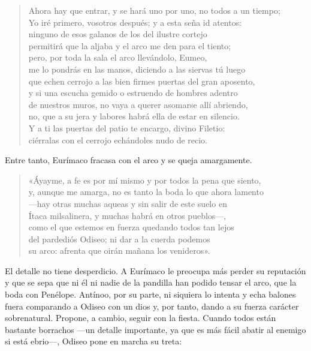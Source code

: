 \begin{verse}
Ahora hay que entrar, y se hará uno por uno, no todos a un tiempo;\\
Yo iré primero, vosotros después; y a esta seña id atentos:\\
ninguno de esos galanos de los del ilustre cortejo\\
permitirá que la aljaba y el arco me den para el tiento;\\
pero, por toda la sala el arco llevándolo, Eumeo,\\
me lo pondrás en las manos, diciendo a las siervas tú luego\\
que echen cerrojo a las bien firmes puertas del gran aposento,\\
y si una escucha gemido o estruendo de hombres adentro\\
de nuestros muros, no vaya a querer asomarse allí abriendo,\\
no, que a su jera y labores habrá ella de estar en silencio.\\
Y a ti las puertas del patio te encargo, divino Filetio:\\
ciérralas con el cerrojo echándoles nudo de recio.
\end{verse}

Entre tanto, Eurímaco fracasa con el arco y se queja amargamente.

\begin{verse}
«Áyayme, a fe es por mí mismo y por todos la pena que siento,\\
y, aunque me amarga, no es tanto la boda lo que ahora lamento\\
---hay otras muchas aqueas y sin salir de este suelo en\\
Ítaca milsalinera, y muchas habrá en otros pueblos---,\\
como el que estemos en fuerza quedando todos tan lejos\\
del pardediós Odiseo; ni dar a la cuerda podemos\\
su arco: afrenta que oirán mañana los venideros».
\end{verse}

El detalle no tiene desperdicio. A Eurímaco le preocupa más perder su reputación y que se sepa que ni él ni nadie de la pandilla han podido tensar el arco, que la boda con Penélope. Antínoo, por su parte, ni siquiera lo intenta y echa balones fuera comparando a Odiseo con un dios y, por tanto, dando a su fuerza carácter sobrenatural. Propone, a cambio, seguir con la fiesta. Cuando todos están bastante borrachos ---un detalle importante, ya que es más fácil abatir al enemigo si está ebrio---, Odiseo pone en marcha su treta:

